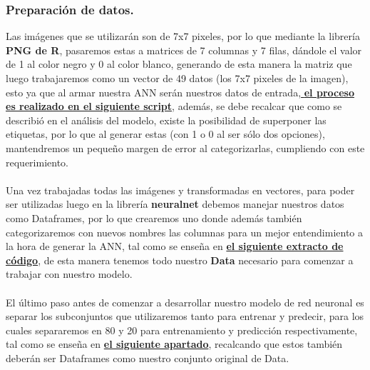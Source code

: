 \documentclass[12pt]{article}
\begin{document}
\subsubsection{Preparación de datos.}
Las imágenes que se utilizarán son de 7x7 pixeles, por lo que mediante la librería  \textbf{PNG de R}, pasaremos estas a matrices de 7 columnas y 7 filas, dándole el valor de 1 al color negro y 0 al color blanco, generando de esta manera la matriz que luego trabajaremos como un vector de 49 datos (los 7x7 pixeles de la imagen), esto ya que al armar nuestra ANN serán nuestros datos de entrada,\hyperref[lst:procesamiento_imagenes]{ \textbf{el proceso es realizado en el siguiente script}}, además, se debe recalcar que como se describió en el análisis del modelo, existe la posibilidad de superponer las etiquetas, por lo que al generar estas (con 1 o 0 al ser sólo dos opciones), mantendremos un pequeño margen de error al categorizarlas, cumpliendo con este requerimiento.\\
\\
Una vez trabajadas todas las imágenes y transformadas en vectores, para poder ser utilizadas luego en la librería  \textbf{neuralnet} debemos manejar nuestros datos como Dataframes, por lo que crearemos uno donde además también categorizaremos con nuevos nombres las columnas para un mejor entendimiento a la hora de generar la ANN, tal como se enseña en \hyperref[lst:dataframe_vectores_etiquetas]{\textbf{el siguiente extracto de código}}, de esta manera tenemos todo nuestro \textbf{Data} necesario para comenzar a trabajar con nuestro modelo.\\
\\
El último paso antes de comenzar a desarrollar nuestro modelo de red neuronal es separar los subconjuntos que utilizaremos tanto para entrenar y predecir, para los cuales separaremos en 80 y 20 para entrenamiento y predicción respectivamente, tal como se enseña en \hyperref[lst:division_datos]{ \textbf{el siguiente apartado}}, recalcando que estos también deberán ser Dataframes como nuestro conjunto original de Data.
\end{document}

